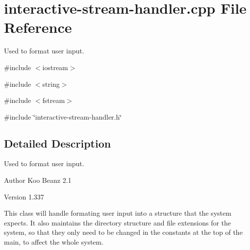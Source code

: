 \hypertarget{interactive-stream-handler_8cpp}{
\section{interactive-\/stream-\/handler.cpp File Reference}
\label{interactive-stream-handler_8cpp}
}


Used to format user input.  


{\ttfamily \#include $<$iostream$>$}\par
{\ttfamily \#include $<$string$>$}\par
{\ttfamily \#include $<$fstream$>$}\par
{\ttfamily \#include \char`\"{}interactive-\/stream-\/handler.h\char`\"{}}\par


\subsection{Detailed Description}
Used to format user input. \begin{DoxyAuthor}{Author}
Koo Beanz 2.1 
\end{DoxyAuthor}
\begin{DoxyVersion}{Version}
1.337
\end{DoxyVersion}
This class will handle formating user input into a structure that the system expects. It also maintains the directory structure and file extensions for the system, so that they only need to be changed in the constants at the top of the main, to affect the whole system. 